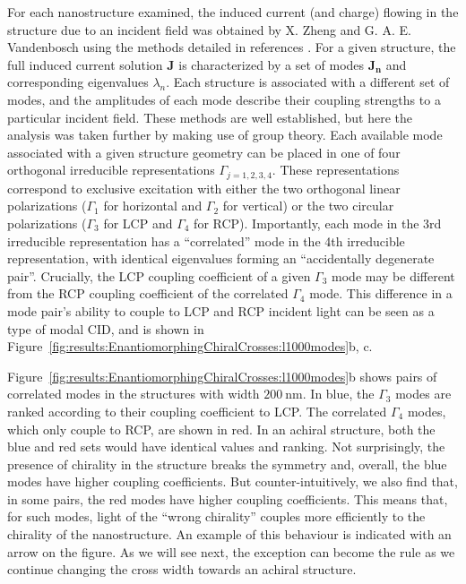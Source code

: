 For each nanostructure examined, the induced current (and charge) flowing in the structure due to an incident field was obtained by X. Zheng and G. A. E. Vandenbosch using the methods detailed in references \cite{Collins2018, Zheng2012}. For a given structure, the full induced current solution $\mathbf{J}$ is characterized by a set of modes $\mathbf{J_n}$ and corresponding eigenvalues $\lambda_{n}$. Each structure is associated with a different set of modes, and the amplitudes of each mode describe their coupling strengths to a particular incident field.
These methods are well established, but here the analysis was taken further by making use of group theory. Each available mode associated with a given structure geometry can be placed in one of four orthogonal irreducible representations $\Gamma _{j = 1,2,3,4}$. These representations correspond to exclusive excitation with either the two orthogonal linear polarizations ($\Gamma _{1}$ for horizontal and $\Gamma _{2}$ for vertical) or the two circular polarizations ($\Gamma _{3}$ for LCP and $\Gamma _{4}$ for RCP). 
Importantly, each mode in the 3rd irreducible representation has a ``correlated'' mode in the 4th irreducible representation, with identical eigenvalues forming an ``accidentally degenerate pair''. 
Crucially, the LCP coupling coefficient of a given $\Gamma _{3}$ mode may be different from the RCP coupling coefficient of the correlated $\Gamma _{4}$ mode. 
This difference in a mode pair's ability to couple to LCP and RCP incident light can be seen as a type of modal CID, and is shown in Figure~\ref{fig:results:EnantiomorphingChiralCrosses:l1000modes}b, c. 

Figure~\ref{fig:results:EnantiomorphingChiralCrosses:l1000modes}b shows pairs of correlated modes in the structures with width $\SI{200}{\nano\m}$. In blue, the $\Gamma _{3}$ modes are ranked according to their coupling coefficient to LCP. The correlated $\Gamma _{4}$ modes, which only couple to RCP, are shown in red. In an achiral structure, both the blue and red sets would have identical values and ranking. Not surprisingly, the presence of chirality in the structure breaks the symmetry and, overall, the blue modes have higher coupling coefficients. 
But counter-intuitively, we also find that, in some pairs, the red modes have higher coupling coefficients. This means that, for such modes, light of the ``wrong chirality'' couples more efficiently to the chirality of the nanostructure. An example of this behaviour is indicated with an arrow on the figure. As we will see next, the exception can become the rule as we continue changing the cross width towards an achiral structure.

